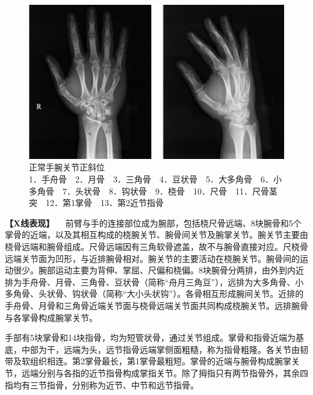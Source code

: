 \begin{figure}[!htbp]
 \centering
 \includegraphics{./images/Image00005.jpg}
 \captionsetup{justification=centering}
 \caption{正常手腕关节正斜位\\{\small 1．手舟骨　2．月骨　3．三角骨　4．豆状骨　5．大多角骨　6．小多角骨　7．头状骨　8．钩状骨　9．桡骨　10．尺骨　11．尺骨茎突　12．第1掌骨　13．第2近节指骨}}
 \label{fig2-1-3}
  \end{figure} 

\textbf{【X线表现】}
　前臂与手的连接部位成为腕部，包括桡尺骨远端、8块腕骨和5个掌骨的近端，以及其相互构成的桡腕关节、腕骨间关节及腕掌关节。腕关节主要由桡骨远端和腕骨组成。尺骨远端因有三角软骨遮盖，故不与腕骨直接对应。尺桡骨远端关节面为凹形，与近排腕骨相对。腕关节的主要活动在桡腕关节。腕骨间的运动很少。腕部运动主要为背伸、掌屈、尺偏和桡偏。8块腕骨分两排，由外到内近排为手舟骨、月骨、三角骨、豆状骨（简称“舟月三角豆”），远排为大多角骨、小多角骨、头状骨、钩状骨（简称“大小头状钩”）。各骨相互形成腕间关节。近排的手舟骨、月骨和三角骨近端关节面与桡骨远端关节面共同构成桡腕关节。远排腕骨与各掌骨构成腕掌关节。

手部有5块掌骨和14块指骨，均为短管状骨，通过关节组成。掌骨和指骨近端为基底，中部为干，远端为头，远节指骨远端掌侧面粗糙，称为指骨粗隆。各关节由韧带及软组织相连。第2掌骨最长，第1掌骨最粗短。掌骨的近端与腕骨构成腕掌关节，远端分别与各指的近节指骨构成掌指关节。除了拇指只有两节指骨外，其余四指均有三节指骨，分别称为近节、中节和远节指骨。

